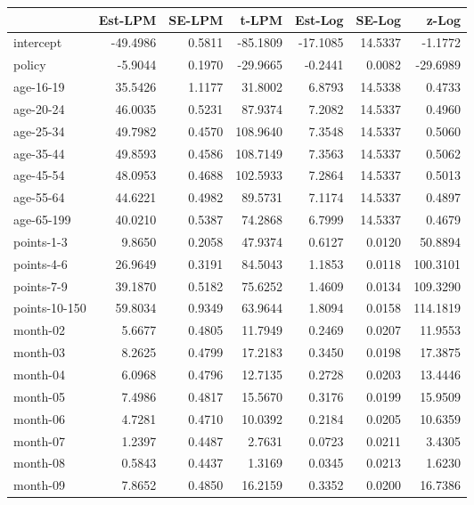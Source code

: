 \documentclass[10pt]{article}
\begin{document}
\begin{table}[ht]
\centering
\begin{tabular}{lrrrrrr}
  \hline
 & Est-LPM & SE-LPM & t-LPM & Est-Log & SE-Log & z-Log \\ 
  \hline
intercept & -49.4986 & 0.5811 & -85.1809 & -17.1085 & 14.5337 & -1.1772 \\ 
  policy & -5.9044 & 0.1970 & -29.9665 & -0.2441 & 0.0082 & -29.6989 \\ 
  age-16-19 & 35.5426 & 1.1177 & 31.8002 & 6.8793 & 14.5338 & 0.4733 \\ 
  age-20-24 & 46.0035 & 0.5231 & 87.9374 & 7.2082 & 14.5337 & 0.4960 \\ 
  age-25-34 & 49.7982 & 0.4570 & 108.9640 & 7.3548 & 14.5337 & 0.5060 \\ 
  age-35-44 & 49.8593 & 0.4586 & 108.7149 & 7.3563 & 14.5337 & 0.5062 \\ 
  age-45-54 & 48.0953 & 0.4688 & 102.5933 & 7.2864 & 14.5337 & 0.5013 \\ 
  age-55-64 & 44.6221 & 0.4982 & 89.5731 & 7.1174 & 14.5337 & 0.4897 \\ 
  age-65-199 & 40.0210 & 0.5387 & 74.2868 & 6.7999 & 14.5337 & 0.4679 \\ 
  points-1-3 & 9.8650 & 0.2058 & 47.9374 & 0.6127 & 0.0120 & 50.8894 \\ 
  points-4-6 & 26.9649 & 0.3191 & 84.5043 & 1.1853 & 0.0118 & 100.3101 \\ 
  points-7-9 & 39.1870 & 0.5182 & 75.6252 & 1.4609 & 0.0134 & 109.3290 \\ 
  points-10-150 & 59.8034 & 0.9349 & 63.9644 & 1.8094 & 0.0158 & 114.1819 \\ 
  month-02 & 5.6677 & 0.4805 & 11.7949 & 0.2469 & 0.0207 & 11.9553 \\ 
  month-03 & 8.2625 & 0.4799 & 17.2183 & 0.3450 & 0.0198 & 17.3875 \\ 
  month-04 & 6.0968 & 0.4796 & 12.7135 & 0.2728 & 0.0203 & 13.4446 \\ 
  month-05 & 7.4986 & 0.4817 & 15.5670 & 0.3176 & 0.0199 & 15.9509 \\ 
  month-06 & 4.7281 & 0.4710 & 10.0392 & 0.2184 & 0.0205 & 10.6359 \\ 
  month-07 & 1.2397 & 0.4487 & 2.7631 & 0.0723 & 0.0211 & 3.4305 \\ 
  month-08 & 0.5843 & 0.4437 & 1.3169 & 0.0345 & 0.0213 & 1.6230 \\ 
  month-09 & 7.8652 & 0.4850 & 16.2159 & 0.3352 & 0.0200 & 16.7386 \\ 

\end{tabular}
\end{table}
\end{document}
